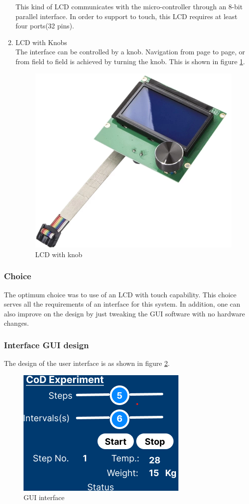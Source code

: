 \begin{enumerate}
     This kind of LCD communicates with the micro-controller through an 8-bit parallel interface. In order to support to touch, this LCD requires at least four ports(32 pins). 
    \item LCD with Knobs \\
    The interface can be controlled by a knob. Navigation from page to page, or from field to field is achieved by turning the knob. This is shown in figure \ref{fig:lcd_with_knobs}.
    \begin{figure}[!ht]
        \centering
        \includegraphics[width=0.6\linewidth]{Figures/lcdwithknob.png}
        \caption{LCD with knob \cite{noauthor_prusa_nodate}}
        \label{fig:lcd_with_knobs}
    \end{figure}
\end{enumerate}
\subsubsection{Choice}

 The optimum choice was to use of an LCD with touch capability. This choice serves all the requirements of an interface for this system. In addition, one can also improve on the design by just tweaking the GUI software with no hardware changes.

\clearpage
\subsubsection{Interface GUI design}
The design of the user interface is as shown in figure \ref{fig:GUI_interface}.
\begin{figure}[!ht]
    \centering
    \includegraphics{Figures/interfacedesign.png}
    \caption{GUI interface}
    \label{fig:GUI_interface}
\end{figure}

